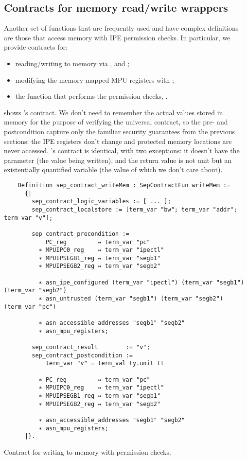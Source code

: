 \subsection{Contracts for memory read/write wrappers}

Another set of functions that are frequently used and have complex definitions are those that access memory with IPE permission checks. In particular, we provide contracts for:
\begin{itemize}
\item reading/writing to memory via ,  and ;
\item modifying the memory-mapped MPU registers with ;
\item the function that performs the permission checks, .
\end{itemize}

 shows 's contract. We don't need to remember the actual values stored in memory for the purpose of verifying the universal contract, so the pre- and postcondition capture only the familiar security guarantees from the previous sections: the IPE registers don't change and protected memory locations are never accessed. 's contract is identical, with two exceptions: it doesn't have the  parameter (the value being written), and the return value is not unit but an existentially quantified variable (the value of which we don't care about).

\begin{listing}
  \begin{verbatim}
    Definition sep_contract_writeMem : SepContractFun writeMem :=
      {|
        sep_contract_logic_variables := [ ... ];
        sep_contract_localstore := [term_var "bw"; term_var "addr"; term_var "v"];

        sep_contract_precondition :=
            PC_reg         ↦ term_var "pc"
          ∗ MPUIPC0_reg    ↦ term_var "ipectl"
          ∗ MPUIPSEGB1_reg ↦ term_var "segb1"
          ∗ MPUIPSEGB2_reg ↦ term_var "segb2"

          ∗ asn_ipe_configured (term_var "ipectl") (term_var "segb1") (term_var "segb2")
          ∗ asn_untrusted (term_var "segb1") (term_var "segb2") (term_var "pc")

          ∗ asn_accessible_addresses "segb1" "segb2"
          ∗ asn_mpu_registers;

        sep_contract_result        := "v";
        sep_contract_postcondition :=
            term_var "v" = term_val ty.unit tt

          ∗ PC_reg         ↦ term_var "pc"
          ∗ MPUIPC0_reg    ↦ term_var "ipectl"
          ∗ MPUIPSEGB1_reg ↦ term_var "segb1"
          ∗ MPUIPSEGB2_reg ↦ term_var "segb2"

          ∗ asn_accessible_addresses "segb1" "segb2"
          ∗ asn_mpu_registers;
      |}.
  \end{verbatim}
  \caption{Contract for writing to memory with permission checks.}
  \label{lst:writeMem}
\end{listing}

